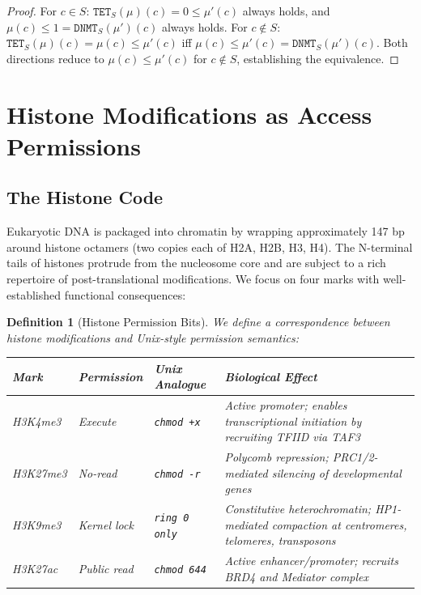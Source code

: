 \documentclass[12pt,a4paper]{article}
\newtheorem{definition}[theorem]{Definition}
\newcommand{\DNMT}{\texttt{DNMT}}
\newcommand{\TET}{\texttt{TET}}
\begin{document}
\begin{proof}
For $c \in S$: $\TET_S(\mu)(c) = 0 \leq \mu'(c)$ always holds, and $\mu(c) \leq 1 = \DNMT_S(\mu')(c)$ always holds. For $c \notin S$: $\TET_S(\mu)(c) = \mu(c) \leq \mu'(c)$ iff $\mu(c) \leq \mu'(c) = \DNMT_S(\mu')(c)$. Both directions reduce to $\mu(c) \leq \mu'(c)$ for $c \notin S$, establishing the equivalence.
\end{proof}

\section{Histone Modifications as Access Permissions}
\label{sec:histone}

\subsection{The Histone Code}

Eukaryotic DNA is packaged into chromatin by wrapping approximately 147 bp around histone octamers (two copies each of H2A, H2B, H3, H4). The N-terminal tails of histones protrude from the nucleosome core and are subject to a rich repertoire of post-translational modifications. We focus on four marks with well-established functional consequences:

\begin{definition}[Histone Permission Bits]
\label{def:histone-perms}
We define a correspondence between histone modifications and Unix-style permission semantics:
\begin{center}
\begin{tabular}{lllp{6.5cm}}
\toprule
\textbf{Mark} & \textbf{Permission} & \textbf{Unix Analogue} & \textbf{Biological Effect} \\
\midrule
H3K4me3 & Execute & \texttt{chmod +x} & Active promoter; enables transcriptional initiation by recruiting TFIID via TAF3 \\
H3K27me3 & No-read & \texttt{chmod -r} & Polycomb repression; PRC1/2-mediated silencing of developmental genes \\
H3K9me3 & Kernel lock & \texttt{ring 0 only} & Constitutive heterochromatin; HP1-mediated compaction at centromeres, telomeres, transposons \\
H3K27ac & Public read & \texttt{chmod 644} & Active enhancer/promoter; recruits BRD4 and Mediator complex \\
\bottomrule
\end{tabular}
\end{center}
\end{definition}
\end{document}
